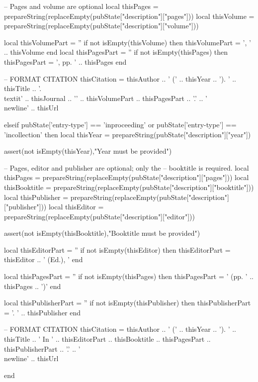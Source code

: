 \documentclass[letterpaper, 10pt]{article}
\begin{document}
\begin{luacode}
					-- Pages and volume are optional
					local thisPages = prepareString(replaceEmpty(pubState["description"]["pages"]))
					local thisVolume = prepareString(replaceEmpty(pubState["description"]["volume"]))

					local thisVolumePart = ''
					if not isEmpty(thisVolume) then
						thisVolumePart = ', ' .. thisVolume
					end
					local thisPagesPart = ''
					if not isEmpty(thisPages) then
						thisPagesPart = ', pp. ' .. thisPages
					end

					-- FORMAT CITATION
					thisCitation = thisAuthor .. ' (' .. thisYear .. '). ' .. thisTitle ..
					'. \\textit{' .. thisJournal .. '}' .. thisVolumePart .. thisPagesPart .. '.' ..
					'\\newline' .. thisUrl


				elseif pubState['entry-type'] == 'inproceeding' or pubState['entry-type'] == 'incollection' then
					local thisYear = prepareString(pubState["description"]["year"])

					assert(not isEmpty(thisYear),"Year must be provided")

					-- Pages, editor and publisher are optional; only the
					-- booktitle is required.
					local thisPages = prepareString(replaceEmpty(pubState["description"]["pages"]))
					local thisBooktitle = prepareString(replaceEmpty(pubState["description"]["booktitle"]))
					local thisPublisher = prepareString(replaceEmpty(pubState["description"]["publisher"]))
					local thisEditor = prepareString(replaceEmpty(pubState["description"]["editor"]))

					assert(not isEmpty(thisBooktitle),"Booktitle must be provided")

					local thisEditorPart = ''
					if not isEmpty(thisEditor) then
						thisEditorPart = thisEditor .. ' (Ed.), '
					end

					local thisPagesPart = ''
					if not isEmpty(thisPages) then
						thisPagesPart = ' (pp. ' .. thisPages .. ')'
					end

					local thisPublisherPart = ''
					if not isEmpty(thisPublisher) then
						thisPublisherPart = '. ' .. thisPublisher
					end

					-- FORMAT CITATION
					thisCitation = thisAuthor .. ' (' .. thisYear .. '). ' .. thisTitle ..
					' In ' .. thisEditorPart .. thisBooktitle ..
					thisPagesPart .. thisPublisherPart .. '.' ..
					'\\newline' .. thisUrl

				end


\end{luacode}
\end{document}

